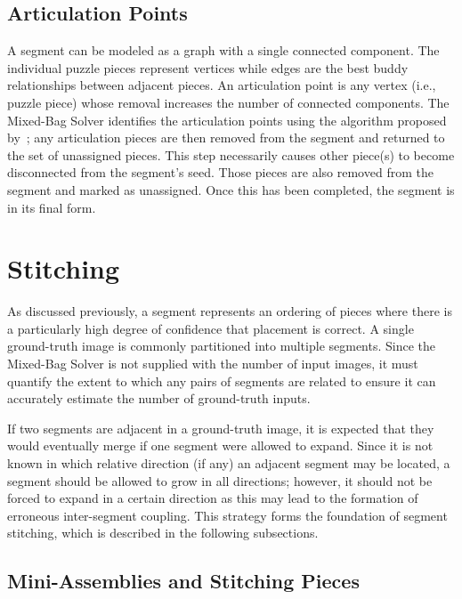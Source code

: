 \subsection{Articulation Points}\label{sec:articulationPoints}

A segment can be modeled as a graph with a single connected component.  The individual puzzle pieces represent vertices while edges are the best buddy relationships between adjacent pieces.  An articulation point is any vertex (i.e., puzzle piece) whose removal increases the number of connected components.  The Mixed-Bag Solver identifies the articulation points using the algorithm proposed by~\cite{cormenIntroToAlgorithms}; any articulation pieces are then removed from the segment and returned to the set of unassigned pieces.  This step necessarily causes other piece(s) to become disconnected from the segment's seed.  Those pieces are also removed from the segment and marked as unassigned. Once this has been completed, the segment is in its final form.

\section{Stitching}\label{sec:stitching}

As discussed previously, a segment represents an ordering of pieces where there is a particularly high degree of confidence that placement is correct.  A single ground-truth image is commonly partitioned into multiple segments. Since the Mixed-Bag Solver is not supplied with the number of input images, it must quantify the extent to which any pairs of segments are related to ensure it can accurately estimate the number of ground-truth inputs.  

If two segments are adjacent in a ground-truth image, it is expected that they would eventually merge if one segment were allowed to expand. Since it is not known in which relative direction (if any) an adjacent segment may be located, a segment should be allowed to grow in all directions; however, it should not be forced to expand in a certain direction as this may lead to the formation of erroneous inter-segment coupling.  This strategy forms the foundation of segment stitching, which is described in the following subsections.

\subsection{Mini-Assemblies and Stitching Pieces}

